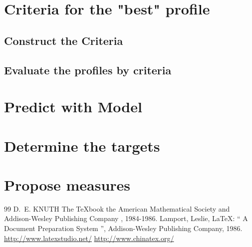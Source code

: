 \documentclass{mcmthesis}
\begin{document}
\section{Criteria for the "best" profile}
\subsection{Construct the Criteria}
\subsection{Evaluate the profiles by criteria }

\section{Predict with Model}
\section{Determine the targets}
\section{Propose measures}

\begin{thebibliography} {99}
   D.~E. KNUTH   The \TeX{}book  the American
  Mathematical Society and Addison-Wesley
  Publishing Company , 1984-1986.
  Lamport, Leslie,  \LaTeX{}: `` A Document Preparation System '',
  Addison-Wesley Publishing Company, 1986.
  \url{http://www.latexstudio.net/}
  \url{http://www.chinatex.org/}
\end{thebibliography}
\end{document}

